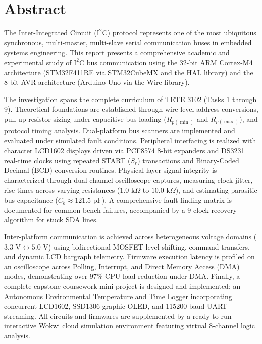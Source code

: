 \documentclass[11pt,a4paper,oneside]{report}
\begin{document}

\makekyudeclarationpage

\setcounter{page}{2}

\chapter*{Abstract}
The Inter-Integrated Circuit ($\text{I}^2\text{C}$) protocol represents one of the most ubiquitous synchronous, multi-master, multi-slave serial communication buses in embedded systems engineering. This report presents a comprehensive academic and experimental study of $\text{I}^2\text{C}$ bus communication using the 32-bit ARM Cortex-M4 architecture (STM32F411RE via STM32CubeMX and the HAL library) and the 8-bit AVR architecture (Arduino Uno via the Wire library). 

The investigation spans the complete curriculum of TETE 3102 (Tasks 1 through 9). Theoretical foundations are established through wire-level address conversions, pull-up resistor sizing under capacitive bus loading ($R_{p(\min)}$ and $R_{p(\max)}$), and protocol timing analysis. Dual-platform bus scanners are implemented and evaluated under simulated fault conditions. Peripheral interfacing is realized with character LCD1602 displays driven via PCF8574 8-bit expanders and DS3231 real-time clocks using repeated START ($S_r$) transactions and Binary-Coded Decimal (BCD) conversion routines. Physical layer signal integrity is characterized through dual-channel oscilloscope captures, measuring clock jitter, rise times across varying resistances ($1.0\text{ k}\Omega$ to $10.0\text{ k}\Omega$), and estimating parasitic bus capacitance ($C_b \approx 121.5\text{ pF}$). A comprehensive fault-finding matrix is documented for common bench failures, accompanied by a 9-clock recovery algorithm for stuck SDA lines. 

Inter-platform communication is achieved across heterogeneous voltage domains ($3.3\text{ V} \leftrightarrow 5.0\text{ V}$) using bidirectional MOSFET level shifting, command transfers, and dynamic LCD bargraph telemetry. Firmware execution latency is profiled on an oscilloscope across Polling, Interrupt, and Direct Memory Access (DMA) modes, demonstrating over $97\%$ CPU load reduction under DMA. Finally, a complete capstone coursework mini-project is designed and implemented: an Autonomous Environmental Temperature and Time Logger incorporating concurrent LCD1602, SSD1306 graphic OLED, and 115200-baud UART streaming. All circuits and firmwares are supplemented by a ready-to-run interactive Wokwi cloud simulation environment featuring virtual 8-channel logic analysis.
\end{document}
